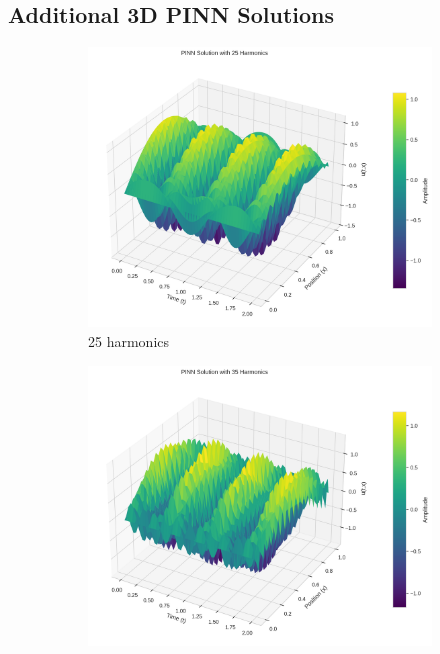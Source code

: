 \subsection{Additional 3D PINN Solutions}

\begin{figure}[H]
    \centering
    \begin{subfigure}[b]{0.32\textwidth}
        \centering
        \includegraphics[width=\textwidth]{figures/3d_comparison_pinn_solution_25h.png}
        \caption{25 harmonics}
    \end{subfigure}
    \hfill
    \begin{subfigure}[b]{0.32\textwidth}
        \centering
        \includegraphics[width=\textwidth]{figures/3d_comparison_pinn_solution_35h.png}

\end{subfigure}
\end{figure}
